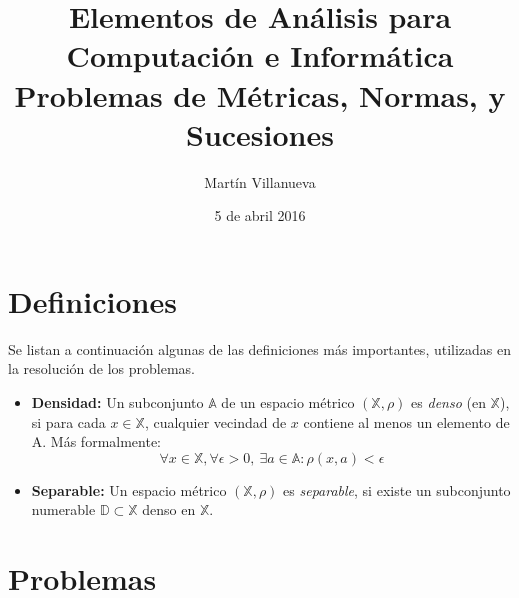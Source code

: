 \documentclass[spanish, fleqn]{article}
\title{Elementos de Análisis para Computación e Informática \\
Problemas de Métricas, Normas, y Sucesiones}
\author{Martín Villanueva}
\date{5 de abril 2016}
\begin{document}
\maketitle

\section{Definiciones}
Se listan a continuación algunas de las definiciones más importantes, utilizadas en la resolución de los problemas.

\begin{itemize}
    \item  \textbf{Densidad:} Un subconjunto $\mathbb{A}$ de un espacio métrico $(\mathbb{X},\rho)$ es \textit{denso} (en $\mathbb{X}$), si para cada $x \in \mathbb{X}$, cualquier vecindad de $x$ contiene al menos un elemento de A. Más formalmente:
    \begin{equation}
        \forall x \in \mathbb{X}, \forall \epsilon>0,\  \exists a \in \mathbb{A}: \rho(x, a)<\epsilon
    \end{equation}
    \item \textbf{Separable:} Un espacio métrico $(\mathbb{X},\rho)$ es \textit{separable}, si existe un subconjunto
    numerable $\mathbb{D} \subset \mathbb{X}$ denso en $\mathbb{X}$.
\end{itemize}

\section{Problemas}
\end{document}
